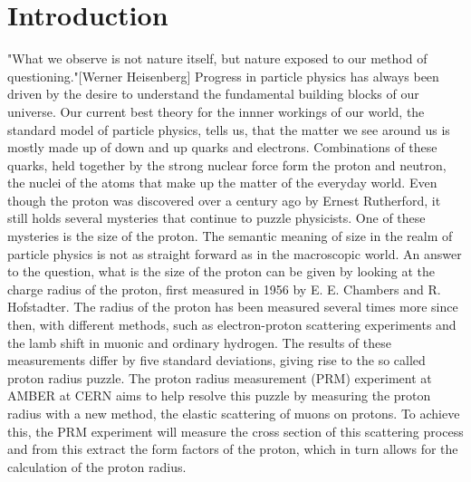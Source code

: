 \chapter{Introduction} \label{chap:introduction}
"What we observe is not nature itself, but nature exposed to our method of questioning."[Werner Heisenberg]\autocite{Heisenberg1958}
\newline
Progress in particle physics has always been driven by the desire to understand the fundamental building blocks of our universe.
\newline Our current best theory for the innner workings of our world,
the standard model of particle physics, tells us, that the matter we see around us is mostly made up of down and up quarks and electrons.
Combinations of these quarks, held together by the strong nuclear force form the proton and neutron, the nuclei of the atoms that make up the matter of the everyday world.\autocite{Workman:2836514}
Even though the proton was discovered over a century ago by Ernest Rutherford\autocite{discoveryProton}, it still holds several mysteries that continue to puzzle physicists.
One of these mysteries is the size of the proton.
\newline
The semantic meaning of size in the realm of particle physics is not as straight forward as in the macroscopic world. An answer to the question,
what is the size of the proton can be given by looking at the charge radius of the proton, first measured in 1956 by E. E. Chambers and R. Hofstadter.\autocite{Hofstadter1956}
\newline
The radius of the proton has been measured several times more since then, with different methods, such as electron-proton scattering experiments and the lamb shift in muonic and ordinary hydrogen.
The results of these measurements differ by five standard deviations, giving rise to the so called proton radius puzzle.\autocite{ProposalAmber}
\newline
The proton radius measurement (PRM) experiment at AMBER at CERN aims to help resolve this puzzle by measuring the proton radius with a new method,
 the elastic scattering of muons on protons.
\newline
To achieve this, the PRM experiment will measure the cross section of this scattering process and from this extract the form factors of the proton, which in turn allows for the calculation of the proton radius.
